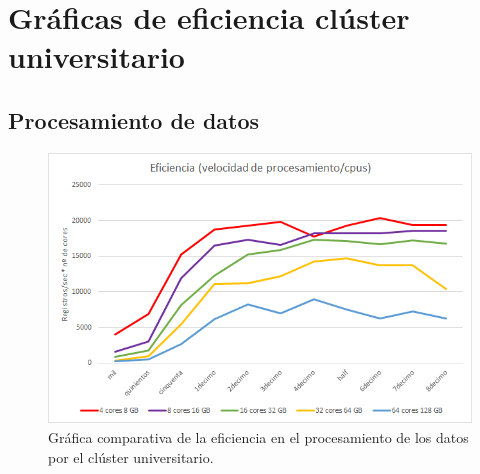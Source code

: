 \chapter{Gráficas de eficiencia clúster universitario \label{apenEficiencia}}
\section{Procesamiento de datos}
\begin{figure}[htp!]
	\centering
	\caption{Gráfica comparativa de la eficiencia en el procesamiento de los datos por el clúster universitario.}
	\label{gra:efiProcUniApen}
	\vspace{5pt}
	\includegraphics[scale=0.9]{graficas/epuni}
\end{figure}
